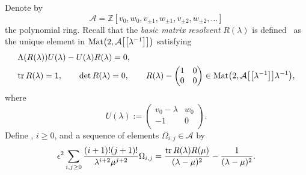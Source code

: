 \documentclass[11pt]{article}
\numberwithin{equation}{section}
\newcommand{\e}{\epsilon}
\newcommand{\ZZ}{\mathbb{Z}}
\newcommand{\tr}{{\rm tr}}
\numberwithin{equation}{section}
\begin{document}
Denote by
\[
\mathcal{A}=\ZZ[v_0, w_0, v_{\pm1}, w_{\pm 1}, v_{\pm 2}, w_{\pm 2}, \dots]
\]
the polynomial ring.
Recall that the {\it basic matrix resolvent} $R(\lambda)$ is defined~\cite{DY} as
the unique element in ${\rm Mat}\bigl(2,\mathcal{A}\bigl[\bigl[\lambda^{-1}\bigr]\bigr]\bigr)$ satisfying
\begin{align*}
& \Lambda(R(\lambda)) U(\lambda) - U(\lambda) R(\lambda) =0,\\
& \tr \, R(\lambda) =1, \qquad \det R(\lambda)=0,\qquad
 R(\lambda) - \begin{pmatrix} 1 & 0 \\ 0 & 0 \\ \end{pmatrix} \in {\rm Mat}\bigl(2,\mathcal{A}\bigl[\bigl[\lambda^{-1}\bigr]\bigr]\lambda^{-1}\bigr), %
\end{align*}
where
\[
U(\lambda) := \begin{pmatrix} v_0-\lambda & w_0 \\ -1 & 0 \\ \end{pmatrix}.
\]
Define , $i\geq0$, and
a sequence of elements $\Omega_{i,j} \in \mathcal{A}$ by
\[
\e^2\sum_{i,j\geq0} \frac{(i+1)!(j+1)!}{\lambda^{i+2} \mu^{j+2}}\Omega_{i,j} = \frac{\tr \, R(\lambda)R(\mu)}{(\lambda-\mu)^2} - \frac{1}{(\lambda-\mu)^2}.
\]
\end{document}
